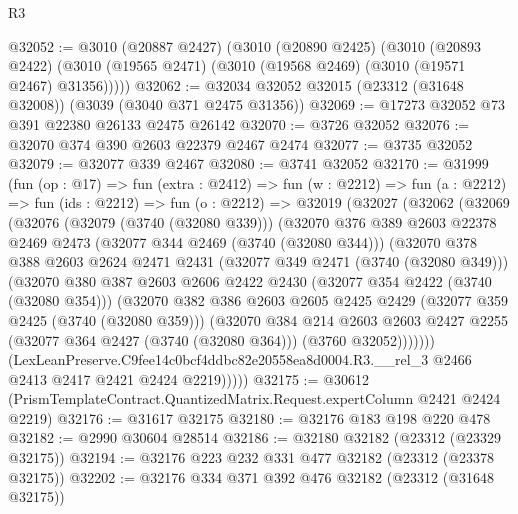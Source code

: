 \begin{lexlean}{R3}
\begin{coremodule}
@32052 := @3010
    (@20887 @2427)
    (@3010
      (@20890 @2425)
      (@3010
        (@20893 @2422)
        (@3010 (@19565 @2471) (@3010 (@19568 @2469) (@3010 (@19571 @2467) @31356)))))
@32062 := @32034 @32052 @32015 (@23312 (@31648 @32008)) (@3039 (@3040 @371 @2475 @31356))
@32069 := @17273 @32052 @73 @391 @22380 @26133 @2475 @26142
@32070 := @3726 @32052
@32076 := @32070 @374 @390 @2603 @22379 @2467 @2474
@32077 := @3735 @32052
@32079 := @32077 @339 @2467
@32080 := @3741 @32052
@32170 := @31999
    (fun (op : @17) =>
    fun (extra : @2412) =>
    fun (w : @2212) =>
    fun (a : @2212) =>
    fun (ids : @2212) =>
    fun (o : @2212) =>
    @32019
      (@32027
        (@32062
          (@32069
            (@32076
              (@32079 (@3740 (@32080 @339)))
              (@32070
                @376
                @389
                @2603
                @22378
                @2469
                @2473
                (@32077 @344 @2469 (@3740 (@32080 @344)))
                (@32070
                  @378
                  @388
                  @2603
                  @2624
                  @2471
                  @2431
                  (@32077 @349 @2471 (@3740 (@32080 @349)))
                  (@32070
                    @380
                    @387
                    @2603
                    @2606
                    @2422
                    @2430
                    (@32077 @354 @2422 (@3740 (@32080 @354)))
                    (@32070
                      @382
                      @386
                      @2603
                      @2605
                      @2425
                      @2429
                      (@32077 @359 @2425 (@3740 (@32080 @359)))
                      (@32070
                        @384
                        @214
                        @2603
                        @2603
                        @2427
                        @2255
                        (@32077 @364 @2427 (@3740 (@32080 @364)))
                        (@3760 @32052)))))))
            (LexLeanPreserve.C9fee14c0bcf4ddbc82e20558ea8d0004.R3.__rel_3
              @2466
              @2413
              @2417
              @2421
              @2424
              @2219)))))
@32175 := @30612 (PrismTemplateContract.QuantizedMatrix.Request.expertColumn @2421 @2424 @2219)
@32176 := @31617 @32175
@32180 := @32176 @183 @198 @220 @478
@32182 := @2990 @30604 @28514
@32186 := @32180 @32182 (@23312 (@23329 @32175))
@32194 := @32176 @223 @232 @331 @477 @32182 (@23312 (@23378 @32175))
@32202 := @32176 @334 @371 @392 @476 @32182 (@23312 (@31648 @32175))

\end{coremodule}
\end{lexlean}
